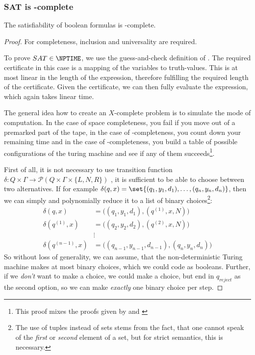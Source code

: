 \subsubsection{SAT is \NPTIME-complete}
\begin{theorem}
	The satisfiability of boolean formulas is \NPTIME-complete.
\end{theorem}
\begin{proof}
	For completeness, inclusion and universality are required.

	To prove $SAT\in \NPTIME$, we use the guess-and-check definition of 
	\NPTIME. The required certificate in this case is a mapping of the variables to 
	truth-values. This is at most linear in the length of the expression, 
	therefore fulfilling the required \PSPACE length of the certificate. Given the 
	certificate, we can then fully evaluate the expression, which again takes 
	linear time.

	The general idea how to create an $X$-complete problem is to simulate the 
	mode of computation. In the case of space completeness, you fail if you 
	move out of a premarked part of the tape, in the case of 
	\PTIME-completeness, you count down your remaining time and in the case of 
	\NPTIME-completeness, you build a table of possible configurations of the 
	turing machine and see if any of them succeeds\footnote{This proof mixes 
		the proofs given by \cite{jones} and \cite{sipser2006introduction}}.

	First of all, it is not necessary to use transition function 
	$\delta: Q\times \Gamma \rightarrow \mathcal{P}(Q\times \Gamma\times \{L, N, R\})$
	, it is sufficient to be able to choose between two alternatives. If for 
	example $\delta(q, x) = \set{(q_1, y_1, d_1), \ldots, (q_n, y_n, d_n)}$, 
	then we can simply and polynomially reduce it to a list of binary 
	choices\footnote{The use of tuples instead of sets stems from the fact, 
	that one cannot speak of the \emph{first} or \emph{second} element of a 
	set, but for strict semantics, this is necessary.}:
	\begin{align}
		\delta(q, x) &= \Big((q_1, y_1, d_1), (q^{(1)}, x, N) \Big)\\
		\delta(q^{(1)}, x) &= \Big((q_2, y_2, d_2), (q^{(2)}, x, N) \Big)\\
		&\vdots \\
		\delta(q^{(n-1)}, x) &= \Big((q_{n-1}, y_{n-1}, d_{n-1}), (q_{n}, y_{n}, d_{n}) \Big)
	\end{align}
	So without loss of generality, we can assume, that the non-deterministic 
	Turing machine makes at most binary choices, which we could code as 
	booleans. Further, if we \emph{don't} want to make a choice, we could make 
	a choice, but end in $q_{reject}$ as the second option, so we can make 
	\emph{exactly} one binary choice per step.


\end{proof}
